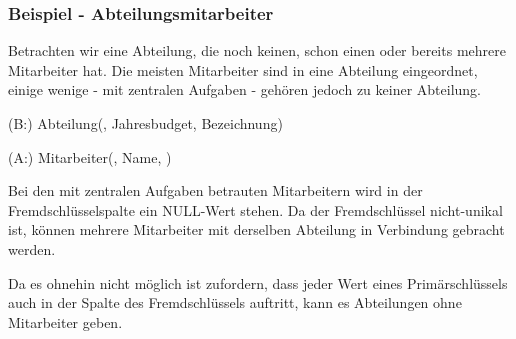         \subsubsection{Beispiel - Abteilungsmitarbeiter}
          Betrachten wir eine Abteilung, die noch keinen, schon einen oder bereits mehrere Mitarbeiter hat. Die meisten Mitarbeiter sind in eine Abteilung eingeordnet, einige wenige - mit zentralen Aufgaben - gehören jedoch zu keiner Abteilung.
          \begin{center}
          \end{center}
          \begin{small}
            (B:) Abteilung(, Jahresbudget, Bezeichnung)

            (A:) Mitarbeiter(, Name, )
          \end{small}

          Bei den mit zentralen Aufgaben betrauten Mitarbeitern wird in der Fremdschlüsselspalte  ein NULL-Wert stehen. Da der Fremdschlüssel nicht-unikal ist, können mehrere Mitarbeiter mit derselben Abteilung in Verbindung gebracht werden.

          Da es ohnehin nicht möglich ist zufordern, dass jeder Wert eines Primärschlüssels auch in der Spalte des Fremdschlüssels  auftritt, kann es Abteilungen ohne Mitarbeiter geben.
